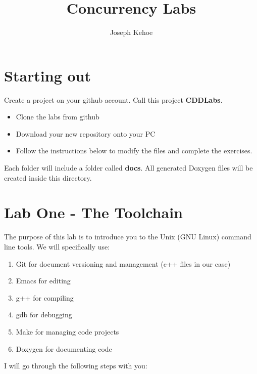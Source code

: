 \documentclass[10pt,a4paper]{article}
\author{Joseph Kehoe}
\title{Concurrency Labs}
\begin{document}
\section{Starting out}
Create a project on your github account. Call this project \textbf{CDDLabs}. 
\begin{itemize}
\item Clone the labs from github
\item Download your new repository onto your PC
\item Follow the instructions below to modify the files and complete the exercises.
\end{itemize}

Each folder will include a folder called \textbf{docs}.  All generated Doxygen files will be created inside this directory.
\section{Lab One - The Toolchain}
The purpose of this lab is to introduce you to the Unix (GNU Linux) command line tools. We will specifically use:
\begin{enumerate}
\item Git for document versioning and management (c++ files in our case)
\item Emacs for editing
\item g++ for compiling
\item gdb for debugging
\item Make for managing code projects
\item Doxygen for documenting code
\end{enumerate}



I will go through the following steps with you:
\end{document}
